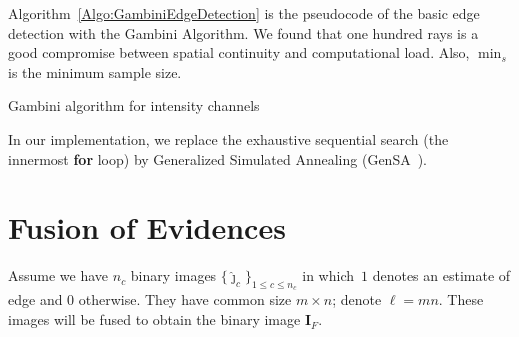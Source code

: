 \documentclass[journal]{IEEEtran}
\begin{document}
Algorithm~\ref{Algo:GambiniEdgeDetection} is the pseudocode of the basic edge detection with the Gambini Algorithm.
We found that one hundred rays is a good compromise between spatial continuity and computational load.
Also, $\min_s$ is the minimum sample size.%

\begin{algorithm}[hbt]
\SetAlgoLined
{}
\caption{Gambini algorithm for intensity channels}\label{Algo:GambiniEdgeDetection}
\end{algorithm}

In our implementation, we replace the exhaustive sequential search (the innermost \textbf{for} loop) by Generalized Simulated Annealing (GenSA~\cite{xgsh}).


\section{Fusion of Evidences}\label{sec_04}

Assume we have $n_c$ binary images $\{\widehat{\bm\jmath}_c\}_{1\leq c\leq n_c}$ in which~$1$ denotes an estimate of edge and $0$ otherwise.
They have common size $m\times n$; denote $\ell=mn$.
These images will be fused to obtain the binary image $\bm I_F$.
\end{document}

